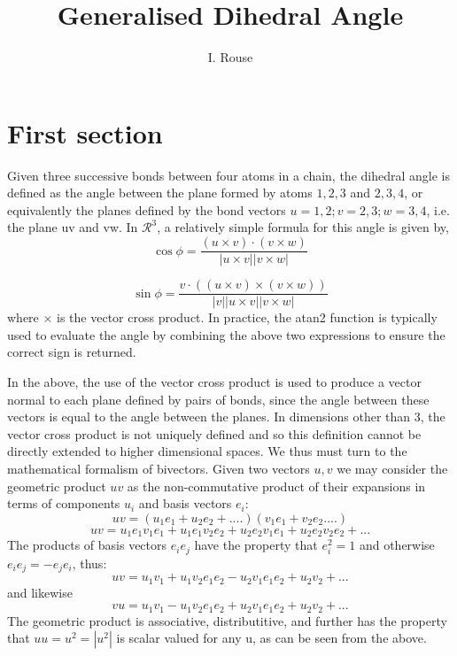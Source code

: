 \documentclass[11pt]{article} %
\title{Generalised Dihedral Angle}
\author{I. Rouse}
\begin{document}
\maketitle

\section{First section}
Given three successive bonds between four atoms in a chain, the dihedral angle is defined as the angle between the plane formed by atoms $1,2,3$ and $2,3,4$, or equivalently the planes defined by the bond vectors $u = 1,2 ; v = 2,3 ; w = 3,4$, i.e. the plane uv and vw. In $\mathcal{R}^3$, a relatively simple formula for this angle is given by,
\begin{equation}
\cos \phi = \frac{ (u \times v) \cdot (v \times w)}{| u \times v| | v \times w| } 
\end{equation}

\begin{equation}
\sin \phi = \frac{ v \cdot  ( (u \times v) \times (v \times w) )}{ |v|  | u \times v| | v \times w| } 
\end{equation}
where $\times$ is the vector cross product. In practice, the atan2 function is typically used to evaluate the angle by combining the above two expressions to ensure the correct sign is returned. 

In the above, the use of the vector cross product is used to produce a vector normal to each plane defined by pairs of bonds, since the angle between these vectors is equal to the angle between the planes. In dimensions other than 3, the vector cross product is not uniquely defined and so this definition cannot be directly extended to higher dimensional spaces. We thus must turn to the mathematical formalism of bivectors. Given two vectors $u,v$ we may consider the geometric product $uv$ as the non-commutative product of their expansions in terms of components $u_i$ and basis vectors $e_i$:
\begin{equation}
uv = ( u_1 e_1 + u_2 e_2 +  ....)  ( v_1 e_1 +v_2 e_2  ....) 
\end{equation}
\begin{equation}
uv =u_1 e_1 v_1 e_1 + u_1 e_1 v_2 e_2  + u_2 e_2 v_1 e_1 + u_2 e_2 v_2 e_2  + ...
\end{equation}
The products of basis vectors $e_i e_j$ have the property that $e_i^2 = 1$ and otherwise $e_i e_j = - e_j e_i$, thus:
\begin{equation}
uv =u_1   v_1   + u_1 v_2 e_1  e_2  - u_2  v_1 e_1 e_2 + u_2  v_2   + ...
\end{equation}
and likewise
\begin{equation}
vu =u_1   v_1   - u_1 v_2 e_1  e_2  + u_2  v_1 e_1 e_2 + u_2  v_2   + ...
\end{equation}
The geometric product is associative, distributitive, and further has the property that $uu = u^2 = |u^2|$ is scalar valued for any u, as can be seen from the above.
\end{document}
